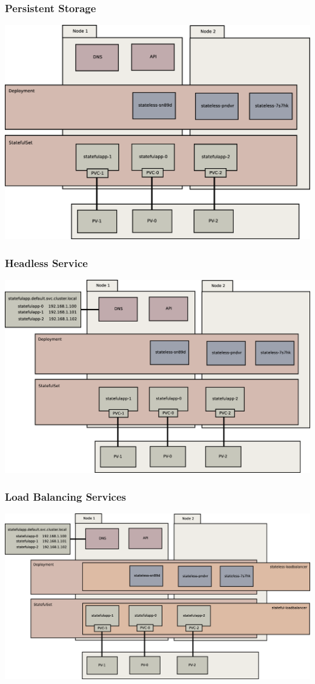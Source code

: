 \documentclass{beamer}
\begin{document}
\begin{frame}
    \frametitle{Persistent Storage}
    \includegraphics[width=\textwidth,height=\textheight,keepaspectratio]{graphics/06-persistence.eps}
\end{frame}

\begin{frame}
    \frametitle{Headless Service}
    \includegraphics[width=\textwidth,height=\textheight,keepaspectratio]{graphics/07-persistentIdentity.eps}
\end{frame}

\begin{frame}
    \frametitle{Load Balancing Services}
    \includegraphics[width=\textwidth,height=\textheight,keepaspectratio]{graphics/08-loadBalancer.eps}
\end{frame}
\end{document}
